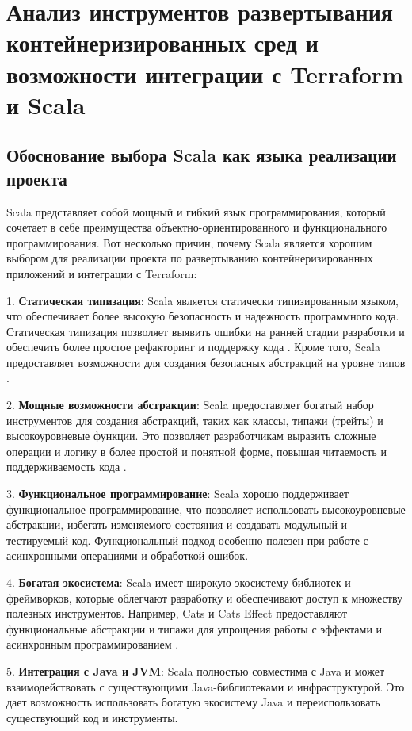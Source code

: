 \chapter{Анализ инструментов развертывания контейнеризированных
сред и возможности интеграции с Terraform и Scala}
\label{chapter1}

\section{Обоснование выбора Scala как языка реализации проекта}

Scala представляет собой мощный и гибкий язык программирования, который сочетает
в себе преимущества объектно-ориентированного и функционального
программирования. Вот несколько причин, почему Scala является хорошим выбором
для реализации проекта по развертыванию контейнеризированных приложений и
интеграции с Terraform:

1. \textbf{Статическая типизация}: Scala является статически типизированным
языком, что обеспечивает более высокую безопасность и надежность
программного кода. Статическая типизация позволяет выявить ошибки
на ранней стадии разработки и обеспечить более простое рефакторинг
и поддержку кода \cite{pierce-types-2012-ru}. Кроме того, Scala предоставляет
возможности для создания безопасных абстракций на уровне типов
\cite{moors2008safe}.

2. \textbf{Мощные возможности абстракции}: Scala предоставляет богатый
набор инструментов для создания абстракций, таких как классы,
типажи (трейты) и высокоуровневые функции. Это позволяет разработчикам
выразить сложные операции и логику в более простой и понятной форме,
повышая читаемость и поддерживаемость кода \cite{moors2008safe}.

3. \textbf{Функциональное программирование}: Scala хорошо поддерживает
функциональное программирование, что позволяет использовать
высокоуровневые абстракции, избегать изменяемого состояния и
создавать модульный и тестируемый код. Функциональный подход
особенно полезен при работе с асинхронными операциями и обработкой ошибок.

4. \textbf{Богатая экосистема}: Scala имеет широкую экосистему библиотек
и фреймворков, которые облегчают разработку и обеспечивают доступ
к множеству полезных инструментов. Например, Cats и Cats Effect
предоставляют функциональные абстракции и типажи для упрощения
работы с эффектами и асинхронным программированием
\cite{cats-effect, cats}.

5. \textbf{Интеграция с Java и JVM}: Scala полностью совместима с Java
и может взаимодействовать с существующими Java-библиотеками и
инфраструктурой. Это дает возможность использовать богатую экосистему
Java и переиспользовать существующий код и инструменты.

